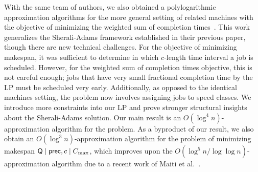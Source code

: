 






With the same team of authors, we also obtained a polylogarithmic approximation algorithms for the more general setting of
related machines with the objective of minimizing the weighted sum of completion times~\cite{DaviesKRTZ21}.
This work generalizes the Sherali-Adams framework established in their previous paper, though there are new technical challenges.
For the objective of minimizing makespan, it was sufficient to determine in which $c$-length time interval a job is scheduled. 
However, for the weighted sum of completion times objective, this is not careful enough; jobs that have very small fractional completion time by the LP 
must be scheduled very early.
Additionally, as opposed to the identical machines setting, the problem now involves assigning jobs to speed classes.
We introduce more constraints into our LP and prove stronger structural insights about the Sherali-Adams solution.
Our main result is an $O(\log^4 n)$-approximation algorithm for the problem.
As a byproduct of our result, we also obtain an $O(\log^3 n)$-approximation algorithm for the problem of minimizing makespan  $\mathsf{Q} \mid \mathsf{prec}, c \mid C_{\textrm{max}}$, which improves upon the $O(\log^5 n/\log \log n)$-approximation algorithm due to a recent work of  Maiti et al.~\cite{MRSSV}.


